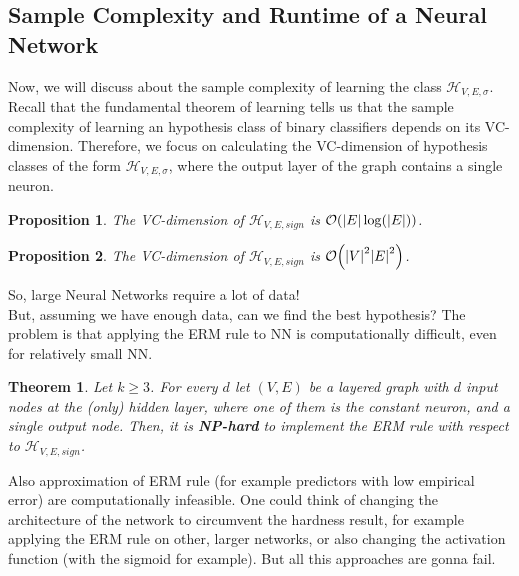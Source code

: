 \documentclass[12pt]{report}
\theoremstyle{plain}
\newtheorem{theorem}{Theorem}[chapter]
\newtheorem{proposition}{Proposition}[chapter]
\newcommand\mcl[1]{\mathcal{#1}}
\begin{document}
\begin{flushleft}
\section{Sample Complexity and Runtime of a Neural Network}
Now, we will discuss about the sample complexity of learning the class $\mcl{H}_{V,E,\sigma}$. Recall that the fundamental theorem of learning tells us that the sample complexity of learning an hypothesis class of binary classifiers depends on its VC-dimension. Therefore, we focus on calculating the VC-dimension of hypothesis classes of the form $\mcl{H}_{V,E,\sigma}$, where the output layer of the graph contains a single neuron.\\
\begin{proposition}
	The VC-dimension of $\mcl{H}_{V,E,sign}$ is $\order{\abs{E}\log(\abs{E})}$.
\end{proposition}
\begin{proposition}
	The VC-dimension of $\mcl{H}_{V,E,sign}$ is $\order{\abs{V}^2\abs{E}^2}$.
\end{proposition}
So, large Neural Networks require a lot of data!\\
But, assuming we have enough data, can we find the best hypothesis? The problem is that applying the ERM rule to NN is computationally difficult, even for relatively small NN.
\begin{theorem}
	Let $k\geq 3$. For every $d$ let $(V,E)$ be a layered graph with $d$ input nodes at the (only) hidden layer, where one of them is the constant neuron, and a single output node. Then, it is \textbf{NP-hard} to implement the ERM rule with respect to $\mcl{H}_{V,E,sign}$.
\end{theorem}
Also approximation of ERM rule (for example predictors with low empirical error) are computationally infeasible. One could think of changing the architecture of the network to circumvent the hardness result, for example applying the ERM rule on other, larger networks, or also changing the activation function (with the sigmoid for example). But all this approaches are gonna fail.


\end{flushleft}
\end{document}
